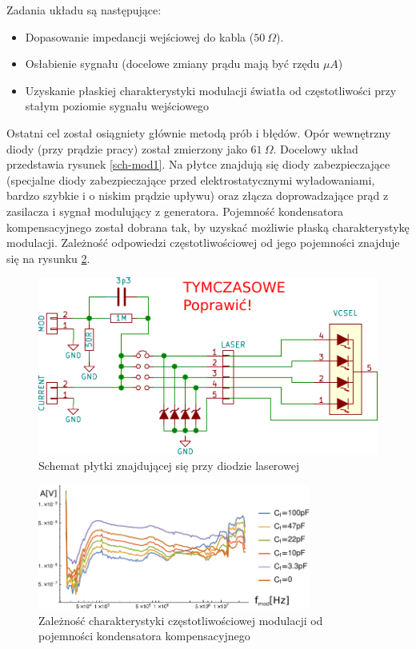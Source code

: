 \documentclass[a4paper,10pt]{article}
\begin{document}
Zadania układu są następujące:
\begin{itemize}
 \item Dopasowanie impedancji wejściowej do kabla ($50~\Omega$).
 \item Osłabienie sygnału (docelowe zmiany prądu mają być rzędu $\mu A$)
 \item Uzyskanie płaskiej charakterystyki modulacji światła od częstotliwości przy stałym poziomie sygnału wejściowego
\end{itemize}

Ostatni cel został osiągniety głównie metodą prób i błędów. Opór wewnętrzny diody (przy prądzie pracy) został zmierzony jako $61~ \Omega$.
Docelowy układ przedstawia rysunek \ref{sch-mod1}. Na płytce znajdują się diody zabezpieczające (specjalne diody zabezpieczające przed elektrostatycznymi wyładowaniami, bardzo szybkie i o niskim prądzie upływu) oraz złącza doprowadzające prąd z zasilacza i sygnał modulujący z generatora. Pojemność kondensatora kompensacyjnego został dobrana tak, by uzyskać możliwie płaską charakterystykę modulacji. Zależność odpowiedzi częstotliwościowej od jego pojemności znajduje się na rysunku \ref{wyk-mod}.

\begin{figure}
\begin{center}
 \includegraphics{./obrazki/dings.pdf}
\end{center}
\caption{Schemat płytki znajdującej się przy diodzie laserowej}
\label{sch-mod}
\end{figure}

\begin{figure}
\begin{center}
 \includegraphics[width=0.8\textwidth]{./obrazki/bw.pdf}
\end{center}
\caption{Zależność charakterystyki częstotliwościowej modulacji od pojemności kondensatora kompensacyjnego}
\label{wyk-mod}
\end{figure}
\end{document}
